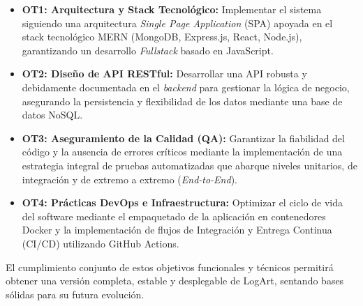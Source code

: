 \begin{itemize}
    \item \textbf{OT1: Arquitectura y Stack Tecnológico:} Implementar el sistema siguiendo una arquitectura \textit{Single Page Application} (SPA) apoyada en el stack tecnológico MERN (MongoDB, Express.js, React, Node.js), garantizando un desarrollo \textit{Fullstack} basado en JavaScript.
    
    \item \textbf{OT2: Diseño de API RESTful:} Desarrollar una API robusta y debidamente documentada en el \textit{backend} para gestionar la lógica de negocio, asegurando la persistencia y flexibilidad de los datos mediante una base de datos NoSQL.
    
    \item \textbf{OT3: Aseguramiento de la Calidad (QA):} Garantizar la fiabilidad del código y la ausencia de errores críticos mediante la implementación de una estrategia integral de pruebas automatizadas que abarque niveles unitarios, de integración y de extremo a extremo (\textit{End-to-End}).
    
    \item \textbf{OT4: Prácticas DevOps e Infraestructura:} Optimizar el ciclo de vida del software mediante el empaquetado de la aplicación en contenedores Docker y la implementación de flujos de Integración y Entrega Continua (CI/CD) utilizando GitHub Actions.
\end{itemize}

El cumplimiento conjunto de estos objetivos funcionales y técnicos permitirá obtener una versión completa, estable y desplegable de LogArt, sentando bases sólidas para su futura evolución.